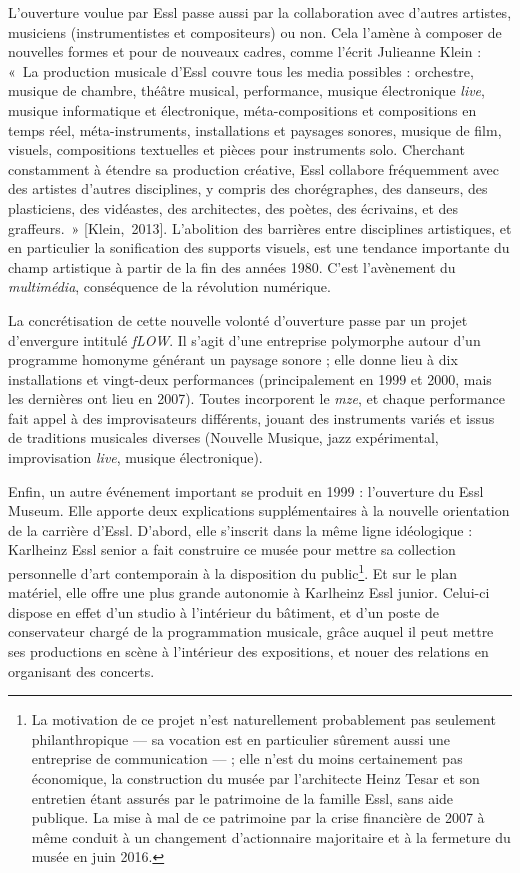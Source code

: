 \documentclass[a4paper,12pt]{article}
\newcommand{\guill}[1]{«~#1~»}
\newcommand{\maze}[0]{\emph{m\symbol{64}ze\textdegree2}}
\newcommand{\cicite}[1]{{\footnotesize[#1]}}
\begin{document}
L'ouverture voulue par Essl passe aussi par la collaboration avec d'autres artistes, musiciens (instrumentistes et compositeurs) ou non. Cela l'amène à composer de nouvelles formes et pour de nouveaux cadres, comme l'écrit Julieanne Klein : \guill{La production musicale d'Essl couvre tous les media possibles : orchestre, musique de chambre, théâtre musical, performance, musique électronique \emph{live}, musique informatique et électronique, méta-compositions et compositions en temps réel, méta-instruments, installations et paysages sonores, musique de film, visuels, compositions textuelles et pièces pour instruments solo. Cherchant constamment à étendre sa production créative, Essl collabore fréquemment avec des artistes d'autres disciplines, y compris des chorégraphes, des danseurs, des plasticiens, des vidéastes, des architectes, des poètes, des écrivains, et des graffeurs.} \cicite{Klein,~2013}. L'abolition des barrières entre disciplines artistiques, et en particulier la sonification des supports visuels, est une tendance importante du champ artistique à partir de la fin des années 1980. C'est l'avènement du \emph{multimédia}, conséquence de la révolution numérique.

La concrétisation de cette nouvelle volonté d'ouverture passe par un projet d'envergure intitulé \emph{fLOW}. Il s'agit d'une entreprise polymorphe autour d'un programme homonyme générant un paysage sonore ; elle donne lieu à dix installations et vingt-deux performances (principalement en 1999 et 2000, mais les dernières ont lieu en 2007). Toutes incorporent le \maze, et chaque performance fait appel à des improvisateurs différents, jouant des instruments variés et issus de traditions musicales diverses (Nouvelle Musique, jazz expérimental, improvisation \emph{live}, musique électronique).

Enfin, un autre événement important se produit en 1999 : l'ouverture du Essl Museum. Elle apporte deux explications supplémentaires à la nouvelle orientation de la carrière d'Essl. D'abord, elle s'inscrit dans la même ligne idéologique : Karlheinz Essl senior a fait construire ce musée pour mettre sa collection personnelle d'art contemporain à la disposition du public\footnote{La motivation de ce projet n'est naturellement probablement pas seulement philanthropique --- sa vocation est en particulier sûrement aussi une entreprise de communication --- ; elle n'est du moins certainement pas économique, la construction du musée par l'architecte Heinz Tesar et son entretien étant assurés par le patrimoine de la famille Essl, sans aide publique. La mise à mal de ce patrimoine par la crise financière de 2007 à même conduit à un changement d'actionnaire majoritaire et à la fermeture du musée en juin 2016.}. Et sur le plan matériel, elle offre une plus grande autonomie à Karlheinz Essl junior. Celui-ci dispose en effet d'un studio à l'intérieur du bâtiment, et d'un poste de conservateur chargé de la programmation musicale, grâce auquel il peut mettre ses productions en scène à l'intérieur des expositions, et nouer des relations en organisant des concerts.
\end{document}

